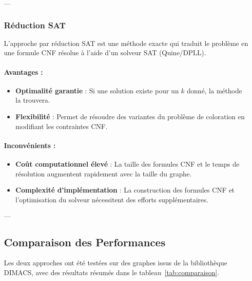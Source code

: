 \documentclass[11pt]{article}
\begin{document}
---

\subsubsection{Réduction SAT}

L'approche par réduction SAT est une méthode exacte qui traduit le problème en une formule CNF résolue à l'aide d'un solveur SAT (Quine/DPLL).

\paragraph{Avantages :}
\begin{itemize}
    \item \textbf{Optimalité garantie} : Si une solution existe pour un \(k\) donné, la méthode la trouvera.
    \item \textbf{Flexibilité} : Permet de résoudre des variantes du problème de coloration en modifiant les contraintes CNF.
\end{itemize}

\paragraph{Inconvénients :}
\begin{itemize}
    \item \textbf{Coût computationnel élevé} : La taille des formules CNF et le temps de résolution augmentent rapidement avec la taille du graphe.
    \item \textbf{Complexité d'implémentation} : La construction des formules CNF et l'optimisation du solveur nécessitent des efforts supplémentaires.
\end{itemize}

---

\subsection{Comparaison des Performances}

Les deux approches ont été testées sur des graphes issus de la bibliothèque DIMACS, avec des résultats résumés dans le tableau~\ref{tab:comparaison}.
\end{document}
